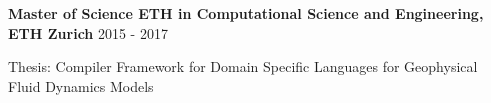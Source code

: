 \textbf{Master of Science ETH in Computational Science and Engineering, ETH Zurich} \hfill 2015 - 2017

Thesis: Compiler Framework for Domain Specific Languages for Geophysical Fluid Dynamics Models

